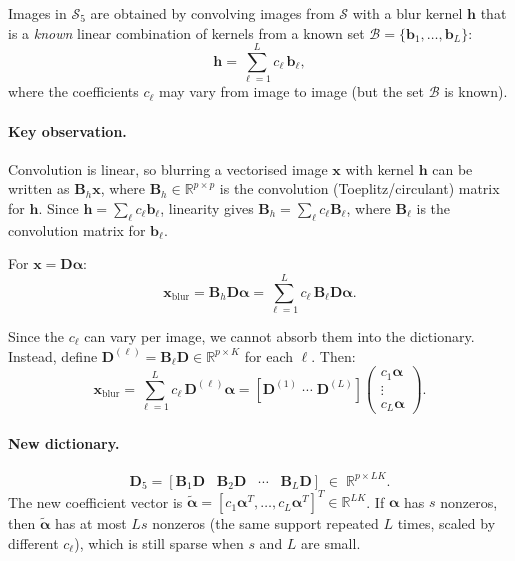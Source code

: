 \documentclass[11pt]{article}
\begin{document}
Images in $\mathcal{S}_5$ are obtained by convolving images from $\mathcal{S}$ with a
blur kernel $\boldsymbol{h}$ that is a \emph{known} linear combination of kernels from
a known set $\mathcal{B} = \{\boldsymbol{b}_1, \dots, \boldsymbol{b}_L\}$:
\[
\boldsymbol{h} = \sum_{\ell=1}^L c_\ell\,\boldsymbol{b}_\ell,
\]
where the coefficients $c_\ell$ may vary from image to image (but the set $\mathcal{B}$ is known).

\paragraph{Key observation.}
Convolution is linear, so blurring a vectorised image $\boldsymbol{x}$ with kernel
$\boldsymbol{h}$ can be written as $\boldsymbol{B}_h\boldsymbol{x}$, where
$\boldsymbol{B}_h \in \mathbb{R}^{p \times p}$ is the convolution (Toeplitz/circulant) matrix
for $\boldsymbol{h}$. Since $\boldsymbol{h} = \sum_\ell c_\ell \boldsymbol{b}_\ell$,
linearity gives $\boldsymbol{B}_h = \sum_\ell c_\ell \boldsymbol{B}_\ell$, where
$\boldsymbol{B}_\ell$ is the convolution matrix for $\boldsymbol{b}_\ell$.

For $\boldsymbol{x} = \boldsymbol{D}\boldsymbol{\alpha}$:
\[
\boldsymbol{x}_{\text{blur}} = \boldsymbol{B}_h\boldsymbol{D}\boldsymbol{\alpha}
= \sum_{\ell=1}^L c_\ell\,\boldsymbol{B}_\ell\boldsymbol{D}\boldsymbol{\alpha}.
\]

Since the $c_\ell$ can vary per image, we cannot absorb them into the dictionary.
Instead, define $\boldsymbol{D}^{(\ell)} = \boldsymbol{B}_\ell\boldsymbol{D} \in \mathbb{R}^{p\times K}$
for each $\ell$. Then:
\[
\boldsymbol{x}_{\text{blur}}
= \sum_{\ell=1}^L c_\ell\,\boldsymbol{D}^{(\ell)}\boldsymbol{\alpha}
= [\boldsymbol{D}^{(1)} \;\cdots\; \boldsymbol{D}^{(L)}]
\begin{pmatrix} c_1\boldsymbol{\alpha} \\ \vdots \\ c_L\boldsymbol{\alpha} \end{pmatrix}.
\]

\paragraph{New dictionary.}
\[
\boxed{\boldsymbol{D}_5 = [\boldsymbol{B}_1\boldsymbol{D} \;\;\; \boldsymbol{B}_2\boldsymbol{D} \;\;\; \cdots \;\;\; \boldsymbol{B}_L\boldsymbol{D}]
\;\in\;\mathbb{R}^{p \times LK}.}
\]
The new coefficient vector is
$\tilde{\boldsymbol{\alpha}} = [c_1\boldsymbol{\alpha}^T,\dots,c_L\boldsymbol{\alpha}^T]^T \in \mathbb{R}^{LK}$.
If $\boldsymbol{\alpha}$ has $s$ nonzeros, then $\tilde{\boldsymbol{\alpha}}$ has at most $Ls$
nonzeros (the same support repeated $L$ times, scaled by different $c_\ell$), which is still
sparse when $s$ and $L$ are small.
\end{document}
